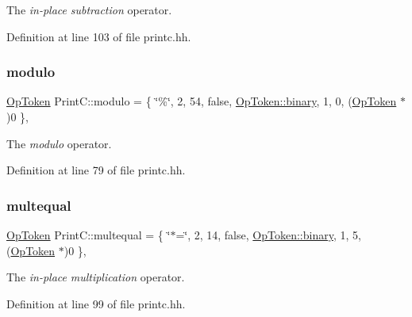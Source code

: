 The {\itshape in-\/place} {\itshape subtraction} operator. 



Definition at line 103 of file printc.\+hh.

\mbox{\label{class_print_c_abcaccebfae7e0ddc773839bf7418a2ac}} 
\subsubsection{\texorpdfstring{modulo}{modulo}}
{\footnotesize\ttfamily \mbox{\hyperlink{class_op_token}{Op\+Token}} Print\+C\+::modulo = \{ \char`\"{}\%\char`\"{}, 2, 54, false, \mbox{\hyperlink{class_op_token_af41c7f108d5662ede7765c5a6c44eaffa3a2ec63522a9329a71ddbe8adc3e752d}{Op\+Token\+::binary}}, 1, 0, (\mbox{\hyperlink{class_op_token}{Op\+Token}} $\ast$)0 \}\hspace{0.3cm}{\ttfamily [static]}, {\ttfamily [protected]}}



The {\itshape modulo} operator. 



Definition at line 79 of file printc.\+hh.

\mbox{\label{class_print_c_ad5eb49438746692a23338c6a7815a83e}} 
\subsubsection{\texorpdfstring{multequal}{multequal}}
{\footnotesize\ttfamily \mbox{\hyperlink{class_op_token}{Op\+Token}} Print\+C\+::multequal = \{ \char`\"{}$\ast$=\char`\"{}, 2, 14, false, \mbox{\hyperlink{class_op_token_af41c7f108d5662ede7765c5a6c44eaffa3a2ec63522a9329a71ddbe8adc3e752d}{Op\+Token\+::binary}}, 1, 5, (\mbox{\hyperlink{class_op_token}{Op\+Token}} $\ast$)0 \}\hspace{0.3cm}{\ttfamily [static]}, {\ttfamily [protected]}}



The {\itshape in-\/place} {\itshape multiplication} operator. 



Definition at line 99 of file printc.\+hh.

\mbox{\label{class_print_c_ac4833401177651caf676e8e136ba35f1}} 
